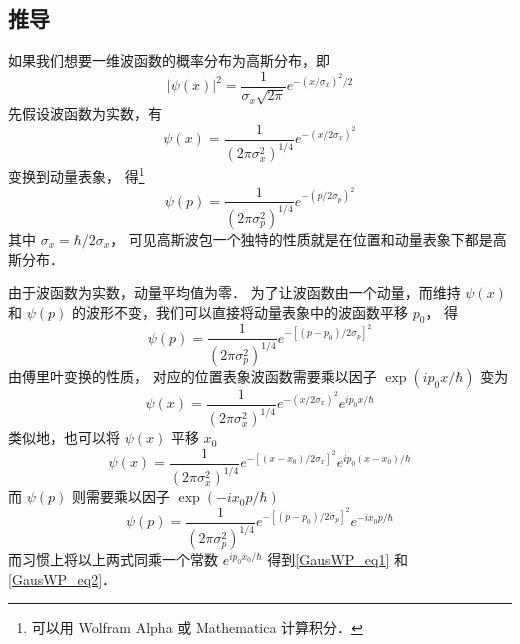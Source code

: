 \subsection{推导}

如果我们想要一维波函数的概率分布为高斯分布，即
\begin{equation}
{\left| {\psi (x)} \right|^2} = \frac{1}{{\sigma_x \sqrt {2\pi } }}{e^{ - {{(x/\sigma_x )}^2}/2}}
\end{equation}
先假设波函数为实数，有
\begin{equation}
\psi (x) = \frac{1}{{{{(2\pi {\sigma_x ^2})}^{1/4}}}}{e^{ - {{(x/2\sigma_x )}^2}}}
\end{equation}
变换到动量表象，%
得\footnote{可以用 Wolfram Alpha 或 Mathematica 计算积分．}
\begin{equation}
\psi (p) = \frac{1}{{{{(2\pi {\sigma_p ^2})}^{1/4}}}}{e^{ - {{(p/2\sigma_p )}^2}}}
\end{equation}
其中 ${\sigma _x} = \hbar /2{\sigma _x}$， %
可见高斯波包一个独特的性质就是在位置和动量表象下都是高斯分布．

由于波函数为实数，动量平均值为零．%
为了让波函数由一个动量，而维持 $\psi(x)$ 和 $\psi(p)$ %
的波形不变，我们可以直接将动量表象中的波函数平移 $p_0$， 得
\begin{equation}
\psi (p) = \frac{1}{{{{(2\pi \sigma _p^2)}^{1/4}}}}{e^{ - {{[(p - {p_0})/2{\sigma _p}]}^2}}}
\end{equation}
由傅里叶变换的性质，%
对应的位置表象波函数需要乘以因子 $\exp(i p_0 x/\hbar)$ 变为
\begin{equation}
\psi (x) = \frac{1}{{{{(2\pi {\sigma_x ^2})}^{1/4}}}}{e^{ - {{(x/2\sigma_x )}^2}}}{e^{i {{{p_0}}}x/{\hbar }}}
\end{equation}
类似地，也可以将 $\psi(x)$ 平移 $x_0$ 
\begin{equation}
\psi (x) = \frac{1}{{{{(2\pi {\sigma_x ^2})}^{1/4}}}}{e^{ - {{[(x-x_0)/2\sigma_x ]}^2}}}{e^{i {{{p_0}}}(x-x_0)/{\hbar }}}
\end{equation}
而 $\psi(p)$ 则需要乘以因子 $\exp ( - i{x_0}p/\hbar )$
\begin{equation}
\psi (p) = \frac{1}{{{{(2\pi \sigma _p^2)}^{1/4}}}}{e^{ - {{[(p - {p_0})/2{\sigma _p}]}^2}}}{e^{ - i{x_0}p/\hbar }}
\end{equation}
而习惯上将以上两式同乘一个常数%
 ${e^{i{p_0}{x_0}/\hbar }}$ 得到\autoref{GausWP_eq1} 和\autoref{GausWP_eq2}． 


